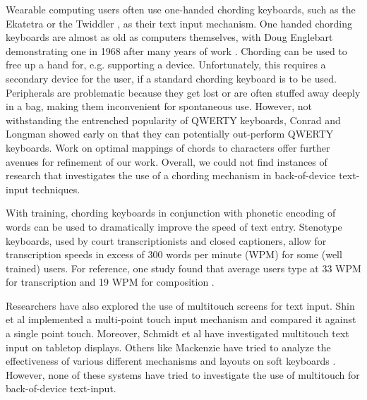 Wearable computing users often use one-handed chording keyboards, such
as the Ekatetra \cite{Ekatetra} or the Twiddler \cite{Twiddler}, as
their text input mechanism.  One handed chording keyboards are almost
as old as computers themselves, with Doug Englebart demonstrating one
in 1968 after many years of work \cite{Englebart}. Chording can be
used to free up a hand for, e.g. supporting a device.  Unfortunately,
this requires a secondary device for the user, if a standard chording
keyboard is to be used.  Peripherals are problematic because they get
lost or are often stuffed away deeply in a bag, making them
inconvenient for spontaneous use.  However, not withstanding the
entrenched popularity of QWERTY keyboards, Conrad and Longman showed
early on that they can potentially out-perform QWERTY
keyboards\cite{Conrad}. Work on optimal mappings of chords to
characters \cite{Gopher} offer further avenues for refinement of our
work. Overall, we could not find instances of research that
investigates the use of a chording mechanism in back-of-device
text-input techniques.

With training, chording keyboards in conjunction with phonetic
encoding of words can be used to dramatically improve the speed of
text entry.  Stenotype keyboards, used by court transcriptionists and
closed captioners, allow for transcription speeds in excess of 300
words per minute (WPM) for some (well trained) users.  For reference,
one study found that average users type at 33 WPM for transcription
and 19 WPM for composition \cite{Karat}.

Researchers have also explored the use of multitouch screens for text
input. Shin et al \cite{Shin} implemented a multi-point touch input
mechanism and compared it against a single point touch. Moreover,
Schmidt et al \cite{Schmidt} have investigated multitouch text input
on tabletop displays. Others like Mackenzie have tried to analyze the
effectiveness of various different mechanisms and layouts on soft
keyboards \cite{Mac}. However, none of these systems have tried to
investigate the use of multitouch for back-of-device text-input.
